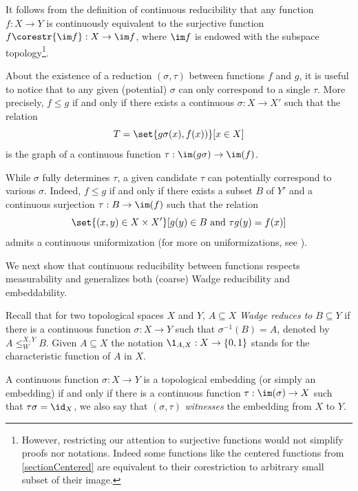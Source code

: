 It follows from the definition of continuous reducibility that any function $f:X\to Y$ is continuously equivalent to the surjective function $f\corestr{\im f}:X\to \im f$,
where $\im f$ is endowed with the subspace topology\footnote{However, restricting our attention to surjective functions would not simplify proofs nor notations.
Indeed some functions like the centered functions from \cref{sectionCentered} are equivalent to their corestriction to arbitrary small subset of their image.}. 

\smallskip

About the existence of a reduction $(\sigma,\tau)$ between functions $f$ and $g$, it is useful to notice that to any given (potential) $\sigma$ can only correspond to a single $\tau$.
More precisely, $f\leq g$ if and only if there exists a continuous $\sigma:X\to X'$ such that the relation  
\[
T=\set{g\sigma(x), f(x))}[x\in X]
\]
is the graph of a continuous function $\tau: \im (g\sigma) \to \im(f)$.

While $\sigma$ fully determines $\tau$, a given candidate $\tau$ can potentially correspond to various $\sigma$.
Indeed, $f\leq g$ if and only if there exists a subset $B$ of $Y'$ and a continuous surjection $\tau:B\to \im(f)$ such that the relation 
\[
\set{(x,y)\in X\times X'}[g(y)\in B \text{ and } \tau g(y) =f(x)]
\]
admits a continuous uniformization (for more on uniformizations, see \cite[Section 18]{kechris}).

\medskip

We next show that continuous reducibility between functions respects measurability and generalizes both (coarse) Wadge reducibility and embeddability.

Recall that for two topological spaces $X$ and $Y$, $A\subseteq X$ \emph{Wadge reduces to} $B\subseteq Y$ if there is a continuous function $\sigma:X\to Y$
such that $\sigma^{-1}(B)=A$, denoted by $A\leq^{X,Y}_WB$.
Given $A\subseteq X$ the notation $\1_{A,X}:X\to \{0,1\}$ stands for the characteristic function of $A$ in $X$.

A continuous function $\sigma:X\to Y$ is a topological embedding (or simply an embedding) if and only if there is a continuous function $\tau:\im(\sigma)\to X$
such that $\tau\sigma=\id_X$, we also say that $(\sigma,\tau)$ \emph{witnesses} the embedding from $X$ to $Y$.

